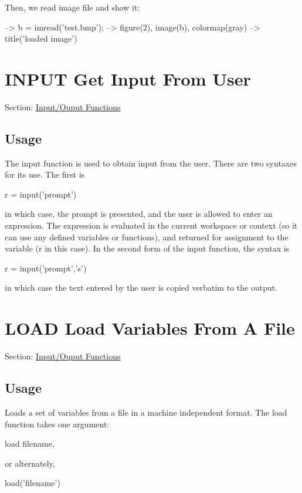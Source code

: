 Then, we read image file and show it\-:


\begin{DoxyVerbInclude}
--> b = imread('test.bmp');
--> figure(2), image(b), colormap(gray)
--> title('loaded image')
\end{DoxyVerbInclude}
 \hypertarget{io_input}{}\section{I\-N\-P\-U\-T Get Input From User}\label{io_input}
Section\-: \hyperlink{sec_io}{Input/\-Ouput Functions} \hypertarget{vtkwidgets_vtkxyplotwidget_Usage}{}\subsection{Usage}\label{vtkwidgets_vtkxyplotwidget_Usage}
The {\ttfamily input} function is used to obtain input from the user. There are two syntaxes for its use. The first is \begin{DoxyVerb}    r = input('prompt')
\end{DoxyVerb}
 in which case, the prompt is presented, and the user is allowed to enter an expression. The expression is evaluated in the current workspace or context (so it can use any defined variables or functions), and returned for assignment to the variable ({\ttfamily r} in this case). In the second form of the {\ttfamily input} function, the syntax is \begin{DoxyVerb}    r = input('prompt','s')
\end{DoxyVerb}
 in which case the text entered by the user is copied verbatim to the output. \hypertarget{io_load}{}\section{L\-O\-A\-D Load Variables From A File}\label{io_load}
Section\-: \hyperlink{sec_io}{Input/\-Ouput Functions} \hypertarget{vtkwidgets_vtkxyplotwidget_Usage}{}\subsection{Usage}\label{vtkwidgets_vtkxyplotwidget_Usage}
Loads a set of variables from a file in a machine independent format. The {\ttfamily load} function takes one argument\-: \begin{DoxyVerb}  load filename,
\end{DoxyVerb}
 or alternately, \begin{DoxyVerb}  load('filename')
\end{DoxyVerb}
